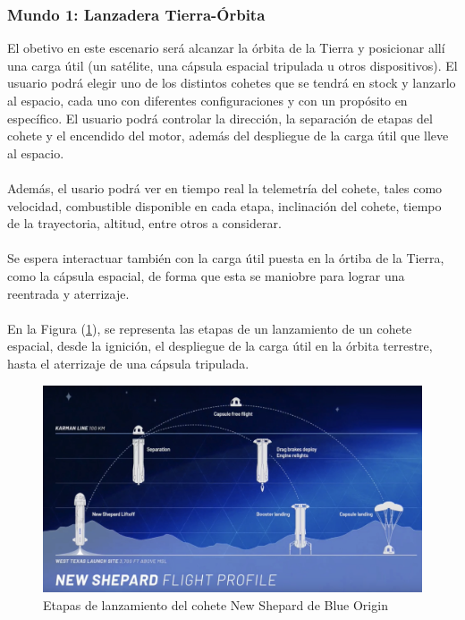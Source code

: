 \documentclass{article}
\begin{document}
\subsubsection{Mundo 1: Lanzadera Tierra-Órbita} \label{EarthOrbit}
El obetivo en este escenario será alcanzar la órbita de la Tierra y posicionar allí una carga útil (un satélite, una cápsula espacial tripulada u otros dispositivos).
El usuario podrá elegir uno de los distintos cohetes que se tendrá en stock y lanzarlo al espacio, cada uno con diferentes configuraciones y con un propósito en específico. El usuario podrá controlar la dirección, la separación de etapas del cohete y el encendido del motor, además del despliegue de la carga útil que lleve al espacio. 
\\\\
Además, el usario podrá ver en tiempo real la telemetría del cohete, tales como velocidad, combustible disponible en cada etapa, inclinación del cohete, tiempo de la trayectoria, altitud, entre otros a considerar.
\\\\
Se espera interactuar también con la carga útil puesta en la órtiba de la Tierra, como la cápsula espacial, de forma que esta se maniobre para lograr una reentrada y aterrizaje.
\\\\
En la Figura (\ref{fig:trayect_surfaceOrbit}), se representa las etapas de un lanzamiento de un cohete espacial, desde la ignición, el despliegue de la carga útil en la órbita terrestre, hasta el aterrizaje de una cápsula tripulada.
\\

\begin{figure}[h]
\includegraphics[width=12cm]{trayect_surfaceOrbit.png}
\centering
\caption{Etapas de lanzamiento del cohete New Shepard de Blue Origin\cite{surfaceOrbit}}
\label{fig:trayect_surfaceOrbit}
\end{figure}
\end{document}
